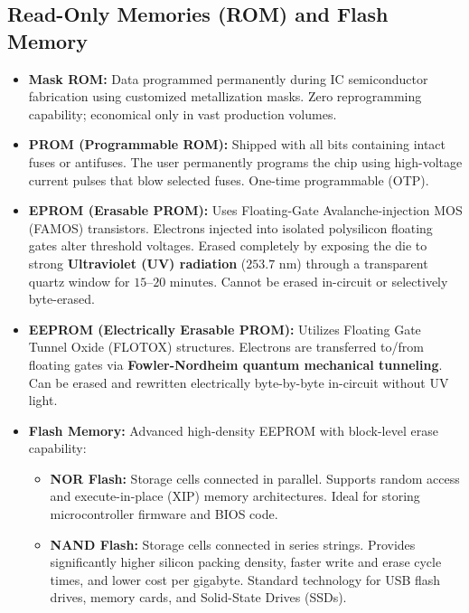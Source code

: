 \documentclass[12pt,a4paper]{article}
\begin{document}
\subsection{Read-Only Memories (ROM) and Flash Memory}
\begin{itemize}[leftmargin=*, itemsep=3pt]
  \item \textbf{Mask ROM:} Data programmed permanently during IC semiconductor fabrication using customized metallization masks. Zero reprogramming capability; economical only in vast production volumes.
  \item \textbf{PROM (Programmable ROM):} Shipped with all bits containing intact fuses or antifuses. The user permanently programs the chip using high-voltage current pulses that blow selected fuses. One-time programmable (OTP).
  \item \textbf{EPROM (Erasable PROM):} Uses Floating-Gate Avalanche-injection MOS (FAMOS) transistors. Electrons injected into isolated polysilicon floating gates alter threshold voltages. Erased completely by exposing the die to strong \textbf{Ultraviolet (UV) radiation} ($253.7\text{ nm}$) through a transparent quartz window for $15\text{--}20\text{ minutes}$. Cannot be erased in-circuit or selectively byte-erased.
  \item \textbf{EEPROM (Electrically Erasable PROM):} Utilizes Floating Gate Tunnel Oxide (FLOTOX) structures. Electrons are transferred to/from floating gates via \textbf{Fowler-Nordheim quantum mechanical tunneling}. Can be erased and rewritten electrically byte-by-byte in-circuit without UV light.
  \item \textbf{Flash Memory:} Advanced high-density EEPROM with block-level erase capability:
    \begin{itemize}
      \item \textbf{NOR Flash:} Storage cells connected in parallel. Supports random access and execute-in-place (XIP) memory architectures. Ideal for storing microcontroller firmware and BIOS code.
      \item \textbf{NAND Flash:} Storage cells connected in series strings. Provides significantly higher silicon packing density, faster write and erase cycle times, and lower cost per gigabyte. Standard technology for USB flash drives, memory cards, and Solid-State Drives (SSDs).
    \end{itemize}
\end{itemize}

\end{document}
